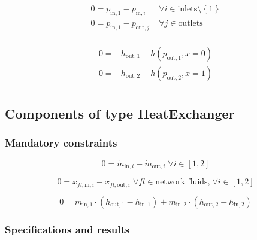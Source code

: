 \begin{equation}
\label{eq:Drum_pressure_constraints}
\begin{split}
0 = p_\mathrm{in,1} - p_{\mathrm{in,}i} & \; \forall i \in \text{inlets} \setminus \left\lbrace 1\right\rbrace\\
0 = p_\mathrm{in,1} - p_{\mathrm{out,}j} & \; \forall j \in \text{outlets}\\
\end{split}
\end{equation}

\begin{equation}
\label{eq:Drum_outlet_constraints}
\begin{split}
0 =&h_\mathrm{out,1} -h\left(p_\mathrm{out,1}, x=0\right)\\0 =&h_\mathrm{out,2} -h\left(p_\mathrm{out,2}, x=1\right)\\\end{split}
\end{equation}


\subsection{Components of type HeatExchanger}

\subsubsection{Mandatory constraints}

\begin{equation}
\label{eq:HeatExchanger_mass_flow_constraints}
0=\dot{m}_{\mathrm{in,}i}-\dot{m}_{\mathrm{out,}i}\; \forall i \in [1, 2]
\end{equation}

\begin{equation}
\label{eq:HeatExchanger_fluid_constraints}
0=x_{fl\mathrm{,in,}i}-x_{fl\mathrm{,out,}i}\;\forall fl \in\text{network fluids,}\; \forall i \in [1, 2]
\end{equation}

\begin{equation}
\label{eq:HeatExchanger_energy_balance_constraints}
0 = \dot{m}_\mathrm{in,1} \cdot \left(h_\mathrm{out,1} - h_\mathrm{in,1} \right) +\dot{m}_\mathrm{in,2} \cdot \left(h_\mathrm{out,2} - h_\mathrm{in,2} \right)
\end{equation}


\subsubsection{Specifications and results}

